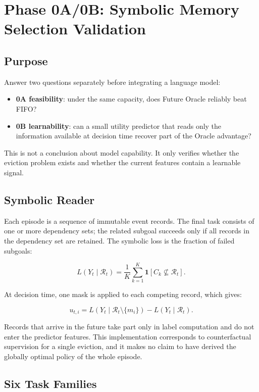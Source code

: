 \section{Phase 0A/0B: Symbolic Memory Selection Validation}

\subsection{Purpose}

Answer two questions separately before integrating a language model:

\begin{itemize}
  \item \textbf{0A feasibility}: under the same capacity, does Future Oracle reliably beat FIFO?
  \item \textbf{0B learnability}: can a small utility predictor that reads only the information available at decision time recover part of the Oracle advantage?
\end{itemize}

This is not a conclusion about model capability. It only verifies whether the eviction problem exists and whether the current features contain a learnable signal.

\subsection{Symbolic Reader}

Each episode is a sequence of immutable event records. The final task consists of one or more dependency sets; the related subgoal succeeds only if all records in the dependency set are retained. The symbolic loss is the fraction of failed subgoals:

\[
L(Y_t\mid\mathcal R_t)
=
\frac{1}{K}\sum_{k=1}^{K}
\mathbf 1[C_k\nsubseteq\mathcal R_t].
\]

At decision time, one mask is applied to each competing record, which gives:

\[
u_{t,i}
=
L(Y_t\mid\mathcal R_t\setminus\{m_i\})
-L(Y_t\mid\mathcal R_t).
\]

Records that arrive in the future take part only in label computation and do not enter the predictor features. This implementation corresponds to counterfactual supervision for a single eviction, and it makes no claim to have derived the globally optimal policy of the whole episode.

\subsection{Six Task Families}

